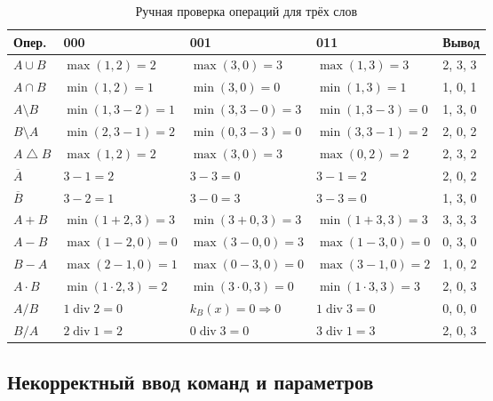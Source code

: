 \documentclass[14pt,a4paper]{extarticle}
\newcommand{\kB}{k_B(x)}
\begin{document}
\begin{table}[htbp]
\caption{Ручная проверка операций для трёх слов}\label{tab:check}
\centering\small\setlength{\tabcolsep}{3pt}
\begin{tabular}{|P{1.5cm}|P{3.9cm}|P{3.9cm}|P{3.9cm}|P{2.0cm}|}
\hline
\textbf{Опер.} & \textbf{000} & \textbf{001} & \textbf{011} & \textbf{Вывод}\\\hline
$A \cup B$ & $\max(1, 2) = 2$ & $\max(3, 0) = 3$ & $\max(1, 3) = 3$ & 2, 3, 3 \\\hline
$A \cap B$ & $\min(1, 2) = 1$ & $\min(3, 0) = 0$ & $\min(1, 3) = 1$ & 1, 0, 1 \\\hline
$A \setminus B$ & $\min(1, 3 - 2) = 1$ & $\min(3, 3 - 0) = 3$ & $\min(1, 3 - 3) = 0$ & 1, 3, 0 \\\hline
$B \setminus A$ & $\min(2, 3 - 1) = 2$ & $\min(0, 3 - 3) = 0$ & $\min(3, 3 - 1) = 2$ & 2, 0, 2 \\\hline
$A \mathbin{\triangle} B$ & $\max(1, 2) = 2$ & $\max(3, 0) = 3$ & $\max(0, 2) = 2$ & 2, 3, 2 \\\hline
$\overline{A}$ & $3 - 1 = 2$ & $3 - 3 = 0$ & $3 - 1 = 2$ & 2, 0, 2 \\\hline
$\overline{B}$ & $3 - 2 = 1$ & $3 - 0 = 3$ & $3 - 3 = 0$ & 1, 3, 0 \\\hline
$A + B$ & $\min(1 + 2, 3) = 3$ & $\min(3 + 0, 3) = 3$ & $\min(1 + 3, 3) = 3$ & 3, 3, 3 \\\hline
$A - B$ & $\max(1 - 2, 0) = 0$ & $\max(3 - 0, 0) = 3$ & $\max(1 - 3, 0) = 0$ & 0, 3, 0 \\\hline
$B - A$ & $\max(2 - 1, 0) = 1$ & $\max(0 - 3, 0) = 0$ & $\max(3 - 1, 0) = 2$ & 1, 0, 2 \\\hline
$A \cdot B$ & $\min(1 \cdot 2, 3) = 2$ & $\min(3 \cdot 0, 3) = 0$ & $\min(1 \cdot 3, 3) = 3$ & 2, 0, 3 \\\hline
$A / B$ & $1 \operatorname{div} 2 = 0$ & $\kB = 0 \Rightarrow 0$ & $1 \operatorname{div} 3 = 0$ & 0, 0, 0 \\\hline
$B / A$ & $2 \operatorname{div} 1 = 2$ & $0 \operatorname{div} 3 = 0$ & $3 \operatorname{div} 1 = 3$ & 2, 0, 3 \\\hline
\end{tabular}
\end{table}

\FloatBarrier
\subsection{Некорректный ввод команд и параметров}
\end{document}
